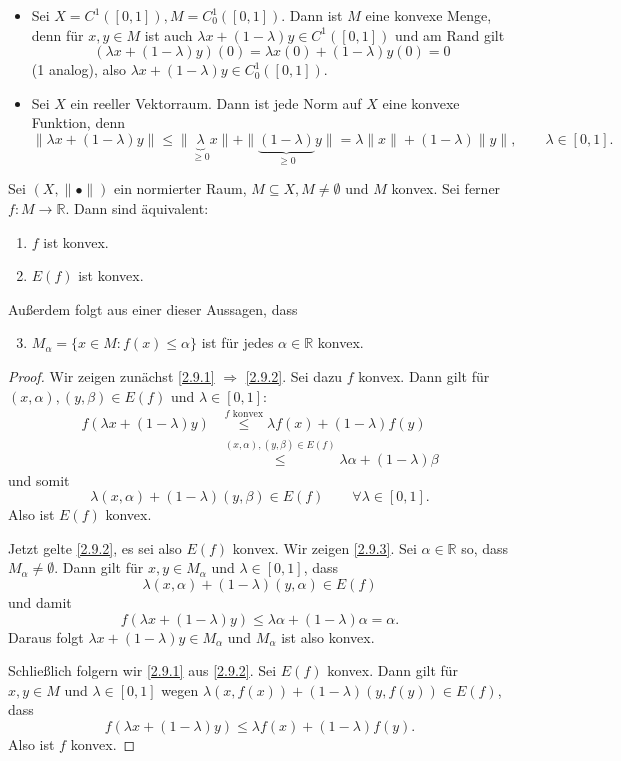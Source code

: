\documentclass[main.tex]{subfiles}
\begin{document}
\begin{bsp}\label{2.8}$ $\\[-1em]
\begin{itemize}
\item Sei $X = C^1([0,1]), M = C_0^1([0,1])$. Dann ist $M$ eine konvexe Menge, denn für $x,y \in M$ ist auch $λx + (1-λ)y \in C^1([0,1])$ und am Rand gilt
$$\left( λx + (1-λ) y \right)(0) = λx(0) + (1-λ) y(0) = 0$$
(1 analog), also $λx + (1-λ) y \in C_0^1 \left( [0,1] \right).$
\item Sei $X$ ein reeller Vektorraum. Dann ist jede Norm auf $X$ eine konvexe Funktion,
denn 
$$\| λx + (1-λ) y \| \le \| \underbrace{λ}_{\ge 0} x \| + \| \underbrace{(1-λ)}_{\ge 0} y \| = λ\| x\| + (1-λ) \| y\|, \qquad λ\in [0,1].$$ 
\end{itemize}
\end{bsp}

\begin{satz}\label{2.9}
Sei $(X, \|•\|)$ ein normierter Raum, $M\subseteq X, M\ne ∅$ und $M$ konvex. Sei ferner $f\colon M\to ℝ.$ Dann sind äquivalent:
\begin{enumerate}[label=(\roman*)]
\item \label{2.9.1} $f$ ist konvex.
\item \label{2.9.2} $E(f)$ ist konvex.
\end{enumerate}
Außerdem folgt aus einer dieser Aussagen, dass
\begin{enumerate}[label=(\roman*)]
\setcounter{enumi}{2}
\item \label{2.9.3} $M_α = \{ x\in M: f(x) \le α \}$ ist für jedes $α\in ℝ$ konvex. 
\end{enumerate}
\end{satz}

\begin{proof}
Wir zeigen zunächst \ref{2.9.1} $\Rightarrow$ \ref{2.9.2}. Sei dazu $f$ konvex. Dann gilt für $(x,α),(y,β)\in E(f)$ und $λ\in [0,1]$:
\begin{align*}
f(λx+ (1-λ) y) &\stackrel{\text{$f$ konvex}}\le λf(x) + (1-λ) f(y)\\
&\stackrel{(x,α), (y,β)\in E(f)}\le λα + (1-λ) β
\end{align*}
und somit 
$$λ(x, α) + (1-λ) (y,β) \in E(f) \qquad ∀λ\in [0,1].$$
Also ist $E(f)$ konvex.

Jetzt gelte \ref{2.9.2}, es sei also $E(f)$ konvex. Wir zeigen \ref{2.9.3}. 
Sei $α\in ℝ$ so, dass $M_α\ne ∅$. Dann gilt für $x,y \in M_α$ und $λ\in [0,1]$, dass
$$λ(x,α) + (1-λ) (y,α)\in E(f)$$
und damit 
$$f(λx + (1-λ) y ) \le λα + (1-λ) α = α.$$
Daraus folgt
$λx + (1-λ) y \in M_α$ und $M_α$ ist also konvex.

Schließlich folgern wir \ref{2.9.1} aus \ref{2.9.2}. Sei $E(f)$ konvex. Dann gilt für $x,y\in M$ und $λ\in [0,1]$ wegen $λ(x,f(x)) + (1-λ) (y,f(y))\in E(f)$, dass
$$f(λx + (1-λ)y) \le λf(x) + (1-λ) f(y).$$
Also ist $f$ konvex.
\end{proof}
\end{document}
